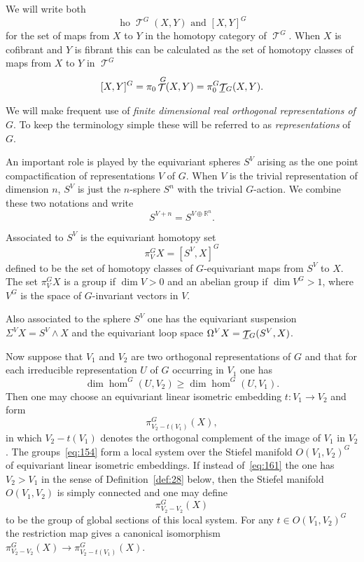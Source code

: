 \documentclass{amsart}
\theoremstyle{definition}
\theoremstyle{remark}
\newcommand{\R}{{\mathbb R}}
\DeclareMathOperator{\ho}{ho}
\DeclareMathOperator{\spaces}{\mathcal T}
\newcommand{\gspaces}[1]{\underline{\spaces\mkern-4mu}\mkern4mu_{\!#1}}
\newcommand{\ugspaces}[1]{\spaces^{#1}}
\begin{document}
We will write both
\[
\ho\ugspaces{G}(X,Y)\text{ and } [X,Y]^{G}
\]
for the set of maps from $X$ to $Y$ in the homotopy category of
$\ugspaces{G}$.  When $X$ is cofibrant and $Y$ is fibrant this can be
calculated as the set of homotopy classes of maps from $X$ to $Y$ in
$\ugspaces{G}$
\[
[X,Y]^{G} = \pi_{0}\ugspaces{G}(X,Y) = \pi_{0}^{G}\gspaces{G}(X,Y).
\]

We will make frequent use of {\em finite dimensional real orthogonal
representations of $G$}.   To keep the terminology simple these will
be referred to as {\em representations} of $G$.   

An important role is played by the equivariant spheres $S^{V}$ arising
as the one point compactification of representations $V$ of $G$.  When
$V$ is the trivial representation of dimension $n$, $S^{V}$ is just
the $n$-sphere $S^{n}$ with the trivial $G$-action.  We combine these
two notations and write
\[
S^{V+n}=S^{V\oplus \R^{n}}.
\]

Associated to $S^{V}$ is the equivariant homotopy set
\[
\pi_{V}^{G}X = [S^{V},X]^{G}
\]
defined to be the set of homotopy classes of $G$-equivariant maps
from $S^{V}$ to $X$.  The set $\pi_{V}^{G}X$ is a group if $\dim
V>0$ and an abelian group if $\dim V^{G}>1$, where $V^{G}$ is the
space of $G$-invariant vectors in $V$.   

Also associated to the sphere $S^{V}$ one has the equivariant suspension
$\Sigma^{V}X = S^{V}\wedge X$ and the equivariant loop space
$\Omega^{V}X= \gspaces{G}(S^{V},X)$.

Now suppose that $V_{1}$ and $V_{2}$ are two orthogonal
representations of $G$ and that for each irreducible representation
$U$ of $G$ occurring in $V_{1}$ one has
\begin{equation}
\label{eq:161}
\dim \hom^{G}(U,V_{2})\ge \dim \hom^{G}(U, V_{1}).
\end{equation}
Then one may choose an equivariant linear isometric embedding $t:V_{1}\to
V_{2}$ and form
\begin{equation}
\label{eq:154}
\pi_{V_{2}-t(V_{1})}^{G}(X),
\end{equation}
in which $V_{2}-t(V_{1})$ denotes the orthogonal complement of the
image of $V_{1}$ in $V_{2}$.  The groups~\eqref{eq:154} form a local
system over the Stiefel manifold $O(V_{1},V_{2})^{G}$ of equivariant linear isometric 
embeddings.   If instead of~\eqref{eq:161} the one has
$V_{2}>V_{1}$ in the sense of Definition~\ref{def:28} below, then the
Stiefel manifold $O(V_{1},V_{2})$ is simply connected and one may
define 
\[
\pi_{V_{2}-V_{2}}^{G}(X)
\]
to be the group of global sections of this local system.  For any
$t\in O(V_{1},V_{2})^{G}$ the restriction map gives a canonical
isomorphism $\pi_{V_{2}-V_{2}}^{G}(X)\to \pi_{V_{2}-t(V_{1})}^{G}(X)$.
\end{document}
